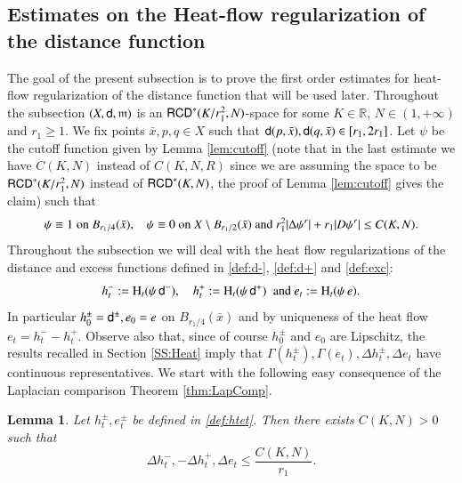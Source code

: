 \documentclass[11pt,reqno]{amsart}
\newcommand{\mm}{\mathfrak m}
\newcommand{\sfd}{{\sf d}}
\renewcommand{\H}{{\rm H}}
\newcommand{\R}{\mathbb{R}}
\newcommand{\RCD}{{\sf RCD}}
\newtheorem{lemma}[theorem]{Lemma}
\theoremstyle{definition}
\theoremstyle{remark}
\theoremstyle{remark}
\theoremstyle{remark}
\theoremstyle{remark}
\theoremstyle{remark}
\theoremstyle{remark}
\theoremstyle{remark}
\begin{document}
\subsection{Estimates on the Heat-flow regularization of the distance function}\label{SS:estHeatReg}
The goal of the present subsection is to prove the  first order estimates for heat-flow regularization of the distance function that will be used later.
Throughout  the subsection $(X,\sfd,\mm)$ is  an  $\RCD^*(K/r_{1}^{2},N)$-space for some $K \in \R$, $N \in (1,+\infty)$ and $r_{1}\geq 1$. We fix  points $\bar{x}, p,q\in X$ such that $\sfd(p,\bar{x}), \sfd(q, \bar{x})\in [r_{1}, 2 r_{1}]$.
Let $\psi$ be the cutoff function given by Lemma \ref{lem:cutoff} (note that in the last estimate we have $C(K,N)$ instead of $C(K,N,R)$ since we are assuming the space to be $\RCD^{*}(K/r_{1}^{2},N)$ instead of  $\RCD^{*}(K,N)$, the proof of   Lemma \ref{lem:cutoff} gives the claim) such that 
$$\psi\equiv 1 \; \text{on $B_{r_{1}/4}(\bar{x})$, \; } \;   \psi\equiv 0 \text{ on $X\setminus B_{r_{1}/2}(\bar{x})$  and } r_{1}^2|\Delta \psi^r|+r_{1} |D \psi^r| \leq C(K,N). $$
Throughout the subsection we will deal with the heat flow regularizations of the distance and excess functions defined in \eqref{def:d-}, \eqref{def:d+} and \eqref{def:exc}:
\begin{equation}\label{def:htet}
h_t^-:= \H_t (\psi\, \sfd^-), \quad  h_t^+:= \H_t (\psi \, \sfd^+) \; \text{ and } e_t:= \H_t(\psi \, e).
\end{equation} 
In particular $h_0^{\pm}=\sfd^{\pm}, e_0=e$ on $B_{r_{1}/4}(\bar{x})$ and by uniqueness of the heat flow $e_t=h^-_t-h^+_t$.  Observe also that, since of course $h_0^{\pm}$ and $e_0$ are Lipschitz, the results recalled in Section \ref{SS:Heat} imply that $\Gamma(h^{\pm}_t), \Gamma(e_t), \Delta h^{\pm}_t, \Delta e_t$ have continuous representatives. We start with the following easy consequence of the Laplacian comparison Theorem \ref{thm:LapComp}.

\begin{lemma}\label{lem:Laphtet}
Let $h^{\pm}_t, e^{\pm}_t$ be defined in  \eqref{def:htet}.  Then there exists $C(K,N)>0$ such that
\begin{equation} \label{eq:Laphtet}
\Delta h^-_t,  - \Delta h^+_t,  \Delta e_t \leq \frac{C(K,N)}{r_{1}}. 
\end{equation}
\end{lemma}
\end{document}
